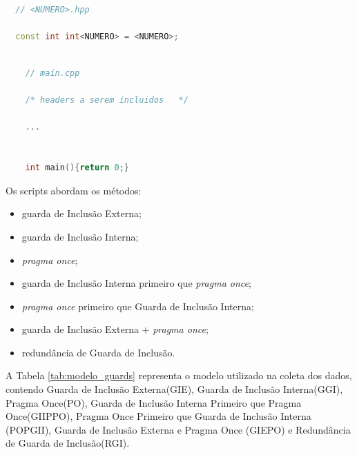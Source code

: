 \begin{lstlisting}[language=C++,caption={Arquivo .hpp gerado pelos scripts de guardas de inclusão},
                                                   label=codigo_27]

  // <NUMERO>.hpp

  const int int<NUMERO> = <NUMERO>;

\end{lstlisting}



\begin{lstlisting}[language=C++,caption={
  Arquivo main.cpp criado pelos scripts de guardas de inclusão},
                                                          label=codigo_28]

    // main.cpp

    /* headers a serem incluidos   */

    ...


    int main(){return 0;}

\end{lstlisting}




Os scripts abordam os métodos:

\begin{itemize}
	\item guarda de Inclusão Externa;
	\item guarda de Inclusão Interna;
	\item \textit{pragma once};
	\item guarda de Inclusão Interna primeiro que \textit{pragma once};
	\item \textit{pragma once} primeiro que  Guarda de Inclusão Interna;
	\item guarda de Inclusão Externa + \textit{pragma once};
	\item redundância de Guarda de Inclusão.
\end{itemize}


A Tabela \ref{tab:modelo_guards} representa o modelo utilizado na coleta dos dados,
 contendo Guarda de Inclusão Externa(GIE), Guarda de Inclusão Interna(GGI),
 Pragma Once(PO), Guarda de Inclusão Interna Primeiro que Pragma Once(GIIPPO),
 Pragma Once Primeiro que Guarda de Inclusão Interna (POPGII),
 Guarda de Inclusão Externa e Pragma Once (GIEPO) e
 Redundância de Guarda de Inclusão(RGI).

